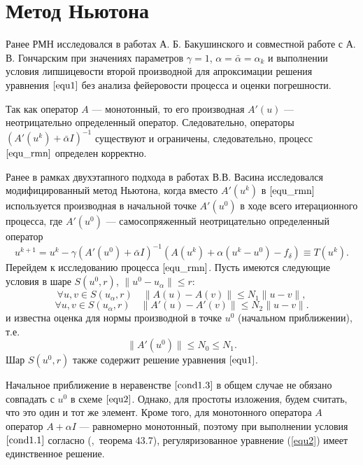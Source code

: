 \newpage
\section{Метод Ньютона}
Ранее РМН исследовался в работах А. Б. Бакушинского \cite{Bak1976,Bak1992} и совместной работе с А. В. Гончарским \cite{BakGon1989} при значениях параметров $\gamma=1$, $\alpha=\bar{\alpha}=\alpha_k$ и выполнении условия липшицевости второй производной для апроксимации решения уравнения $\eqref{equ1}$ без анализа фейеровости процесса и оценки погрешности. 

Так как оператор $A$ --- монотонный, то его производная $A'(u)$ --- неотрицательно определенный оператор. Следовательно, операторы $(A'(u^k)+\bar\alpha I)^{-1}$ существуют и ограничены, следовательно, процесс $\eqref{equ_rmn}$ определен корректно.

Ранее в рамках двухэтапного подхода в работах В.В. Васина \cite{VasAkiMin2013, Vasin2014} исследовался модифицированный метод Ньютона, когда вместо $A'(u^k)$ в $\eqref{equ_rmn}$ используется производная в начальной точке $A'(u^0)$ в ходе всего итерационного процесса, где $A'(u^0)$ --- самосопряженный неотрицательно определенный оператор  
$$
u^{k+1}=u^k-\gamma(A'(u^0)+\bar\alpha I)^{-1}(A(u^k)+\alpha(u^k-u^0)-f_\delta)\equiv{T(u^k)}.
$$
Перейдем к исследованию процесса $\eqref{equ_rmn}$. Пусть имеются следующие условия в шаре $S(u^0, r)$, $\|u^0-u_\alpha\| \le r$:
\begin{equation}\label{cond1.1}
\forall u, v \in S(u_\alpha, r) \quad \|A(u)-A(v)\|\le N_1\|u-v\|,
\end{equation}
\begin{equation}\label{cond1.2}
\forall u, v \in S(u_\alpha, r) \quad \|A'(u)-A'(v)\|\le N_2\|u-v\|.
\end{equation}
и известна оценка для нормы производной в точке $u^0$ (начальном приближении), т.е.
\begin{equation}\label{cond1.3}
\|A'(u^0)\| \le N_0 \le N_1.
\end{equation}
Шар $S(u^0, r)$ также содержит решение уравнения $\eqref{equ1}$. 
\begin{remark}
	Начальное приближение в неравенстве $\eqref{cond1.3}$ в общем случае не обязано совпадать с $u^0$ в схеме $\eqref{equ2}$. Однако, для простоты изложения, будем считать, что это один и тот же элемент. Кроме того, для монотонного оператора $A$ оператор $A+\alpha I$ --- равномерно монотонный, поэтому при выполнении условия $\ref{cond1.1}$ согласно (\cite{KufFuch1988},~теорема 43.7), регуляризованное уравнение (\ref{equ2}) имеет единственное решение.
\end{remark}

